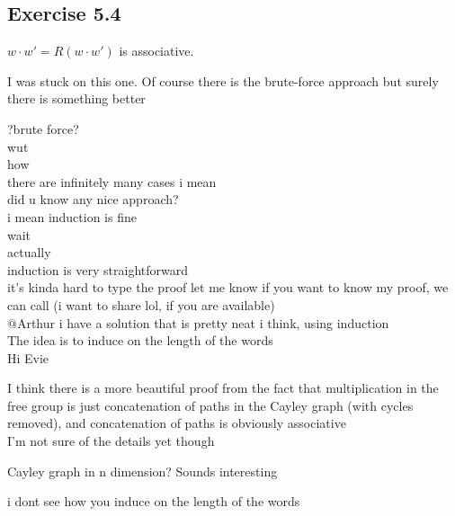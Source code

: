 \documentclass[15pt]{scrartcl}
\begin{document}
\subsection{Exercise 5.4}
\begin{discussion*} $w\cdot w'=R(w\cdot w')$ is associative. 
    \begin{evie*}
        I was stuck on this one. Of course there is the brute-force approach but surely there is something better
    \end{evie*}
    \begin{abboy*}
        ?brute force?
        \\
        wut
        \\
        how
        \\
        there are infinitely many cases i mean
        \\
        did u know any nice approach?
        \\
        i mean induction is fine
        \\
        wait
        \\
        actually
        \\
        induction is very straightforward
        \\
        it's kinda hard to type the proof
        let me know if you want to know my proof, we can call (i want to share lol, if you are available)
        \\
        $@$Arthur
        i have a solution that is pretty neat i think, using induction 
        \\
        The idea is to induce on the length of the words
        \\
        Hi Evie
    \end{abboy*}
    \begin{evie*}
        I think there is a more beautiful proof from the fact that multiplication in the free group is just concatenation of paths in the Cayley graph (with cycles removed), and concatenation of paths is obviously associative 
        \\
        I'm not sure of the details yet though
    \end{evie*}
    \begin{abboy*}
        Cayley graph in n dimension?
        Sounds interesting
    \end{abboy*}
    \begin{arthur*}
        i dont see how you induce on the length of the words
    \end{arthur*}
    \begin{abboy*}

\end{abboy*}
\end{discussion*}
\end{document}
